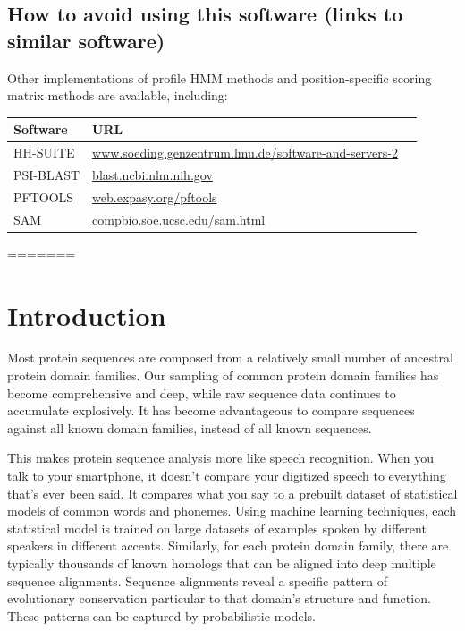 \section{How to avoid using this software (links to similar software)}

Other implementations of profile HMM methods and position-specific
scoring matrix methods are available, including:

\begin{center}
\begin{tabular}{lp{5in}l}
Software  &   URL \\ \hline
HH-SUITE  & \href{http://www.soeding.genzentrum.lmu.de/software-and-servers-2/}{www.soeding.genzentrum.lmu.de/software-and-servers-2}\\
PSI-BLAST & \href{https://blast.ncbi.nlm.nih.gov/}{blast.ncbi.nlm.nih.gov}\\
PFTOOLS   & \href{http://web.expasy.org/pftools/}{web.expasy.org/pftools}\\
SAM       & \href{https://compbio.soe.ucsc.edu/sam.html}{compbio.soe.ucsc.edu/sam.html}\\
\end{tabular}
\end{center}





  









=======
\newpage
\chapter{Introduction}
\label{chapter:introduction}
\setcounter{footnote}{0}

Most protein sequences are composed from a relatively small number of
ancestral protein domain families. Our sampling of common protein
domain families has become comprehensive and deep, while raw sequence
data continues to accumulate explosively. It has become advantageous
to compare sequences against all known domain families, instead of all
known sequences.

This makes protein sequence analysis more like speech recognition.
When you talk to your smartphone, it doesn't compare your digitized
speech to everything that's ever been said. It compares what you say
to a prebuilt dataset of statistical models of common words and
phonemes.  Using machine learning techniques, each statistical model
is trained on large datasets of examples spoken by different speakers
in different accents. Similarly, for each protein domain family, there
are typically thousands of known homologs that can be aligned into
deep multiple sequence alignments. Sequence alignments reveal a
specific pattern of evolutionary conservation particular to that
domain's structure and function. These patterns can be captured by
probabilistic models.

